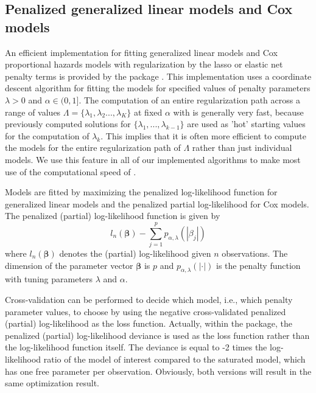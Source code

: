 \documentclass[nojss]{jss}
\begin{document}
\subsection{Penalized generalized linear models and Cox models}\label{methods:penalized}
An efficient implementation for fitting generalized linear models and Cox proportional hazards models with regularization by the lasso or elastic net penalty terms is provided by the  package . This implementation uses a coordinate descent algorithm for fitting the models for specified values of penalty parameters $\lambda > 0$ and $\alpha \in (0,1]$. The computation of an entire regularization path across a range of values $\Lambda = \{\lambda_1,\lambda_2...,\lambda_K\}$ at fixed $\alpha$ with  is generally very fast, because previously computed solutions for $\{\lambda_1,...,\lambda_{k-1}\}$ are used as 'hot' starting values for the computation of $\lambda_k$. This implies that it is often more efficient to compute the models for the entire regularization path of $\Lambda$ rather than just individual models. We use this feature in all of our implemented algorithms to make most use of the computational speed of .

Models are fitted by maximizing the penalized log-likelihood function for generalized linear models and the penalized partial log-likelihood for Cox models. The penalized (partial) log-likelihood function is given by
\begin{equation}\label{pen.part.likelihood}
l_n(\boldsymbol\beta)- \sum_{j=1}^p  p_{\alpha,\lambda}(|\beta_j|)
\end{equation}
where $l_n(\boldsymbol\beta)$ denotes the (partial) log-likelihood given $n$ observations.
The dimension of the parameter vector $\boldsymbol\beta$ is $p$ and $p_{\alpha,\lambda}(|\cdot|)$ is the penalty function with tuning parameters $\lambda$ and $\alpha$.

Cross-validation can be performed to decide which model, i.e., which penalty parameter values, to choose by using the negative cross-validated penalized (partial) log-likelihood as the loss function. Actually, within the  package, the penalized (partial) log-likelihood deviance is used as the loss function rather than the log-likelihood function itself. The deviance is equal to -2 times the log-likelihood ratio of the model of interest compared to the saturated model, which has one free parameter per observation. Obviously, both versions will result in the same optimization result.
\end{document}
